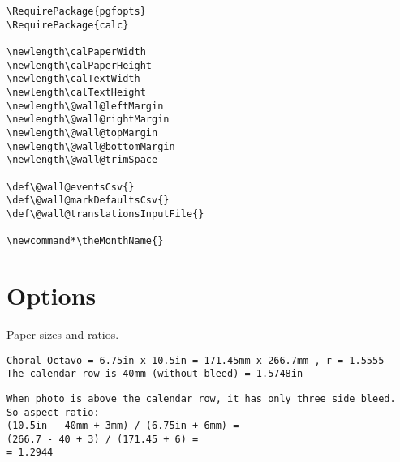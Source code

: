 \documentclass[11pt,oneside]{memoir-article}
\begin{document}
\begin{verbatim}
\RequirePackage{pgfopts}
\RequirePackage{calc}

\newlength\calPaperWidth
\newlength\calPaperHeight
\newlength\calTextWidth
\newlength\calTextHeight
\newlength\@wall@leftMargin
\newlength\@wall@rightMargin
\newlength\@wall@topMargin
\newlength\@wall@bottomMargin
\newlength\@wall@trimSpace

\def\@wall@eventsCsv{}
\def\@wall@markDefaultsCsv{}
\def\@wall@translationsInputFile{}

\newcommand*\theMonthName{}
\end{verbatim}

\chapter{Options}
\label{sec:orgc46e3a4}

Paper sizes and ratios.

\begin{verbatim}
Choral Octavo = 6.75in x 10.5in = 171.45mm x 266.7mm , r = 1.5555
The calendar row is 40mm (without bleed) = 1.5748in
\end{verbatim}


\begin{verbatim}
When photo is above the calendar row, it has only three side bleed.
So aspect ratio:
(10.5in - 40mm + 3mm) / (6.75in + 6mm) = 
(266.7 - 40 + 3) / (171.45 + 6) =
= 1.2944
\end{verbatim}
\end{document}

